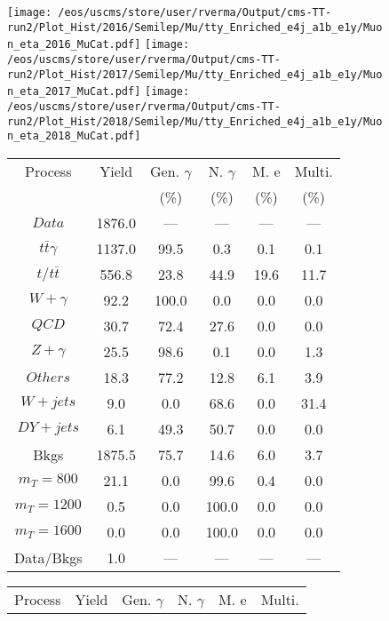 \begin{figure}
\centering
\texttt{[image: /eos/uscms/store/user/rverma/Output/cms-TT-run2/Plot\_Hist/2016/Semilep/Mu/tty\_Enriched\_e4j\_a1b\_e1y/Muon\_eta\_2016\_MuCat.pdf]}
\texttt{[image: /eos/uscms/store/user/rverma/Output/cms-TT-run2/Plot\_Hist/2017/Semilep/Mu/tty\_Enriched\_e4j\_a1b\_e1y/Muon\_eta\_2017\_MuCat.pdf]}
\texttt{[image: /eos/uscms/store/user/rverma/Output/cms-TT-run2/Plot\_Hist/2018/Semilep/Mu/tty\_Enriched\_e4j\_a1b\_e1y/Muon\_eta\_2018\_MuCat.pdf]}
\begin{minipage}[c]{0.32\textwidth}
\centering
\tiny{
\begin{tabular}{cccccc}
\hline
Process & Yield & Gen. $\gamma$ & N. $\gamma$ & M. e & Multi. \\
 &  & (\%) & (\%) & (\%) & (\%)  \\
\hline
                                                                      $ Data $ &  1876.0 &  --- &  --- &  --- &  ---\\
$ t\bar{t}\gamma $ &  1137.0 &  99.5 &  0.3 &  0.1 &  0.1\\
$ t/t\bar{t} $ &  556.8 &  23.8 &  44.9 &  19.6 &  11.7\\
$ W+\gamma $ &  92.2 &  100.0 &  0.0 &  0.0 &  0.0\\
$ QCD $ &  30.7 &  72.4 &  27.6 &  0.0 &  0.0\\
$ Z+\gamma $ &  25.5 &  98.6 &  0.1 &  0.0 &  1.3\\
$ Others $ &  18.3 &  77.2 &  12.8 &  6.1 &  3.9\\
$ W+jets $ &  9.0 &  0.0 &  68.6 &  0.0 &  31.4\\
$ DY+jets $ &  6.1 &  49.3 &  50.7 &  0.0 &  0.0\\
Bkgs &  1875.5 &  75.7 &  14.6 &  6.0 &  3.7\\
$ m_{T} = 800 $ &  21.1 &  0.0 &  99.6 &  0.4 &  0.0\\
$ m_{T} = 1200 $ &  0.5 &  0.0 &  100.0 &  0.0 &  0.0\\
$ m_{T} = 1600 $ &  0.0 &  0.0 &  100.0 &  0.0 &  0.0\\
Data/Bkgs &  1.0 &  --- &  --- &  --- &  ---\\
\hline
\end{tabular}
}
\end{minipage}
\begin{minipage}[c]{0.32\textwidth}
\centering
\tiny{
\begin{tabular}{cccccc}
\hline
Process & Yield & Gen. $\gamma$ & N. $\gamma$ & M. e & Multi. \\

\end{tabular}}
\end{minipage}
\end{figure}

